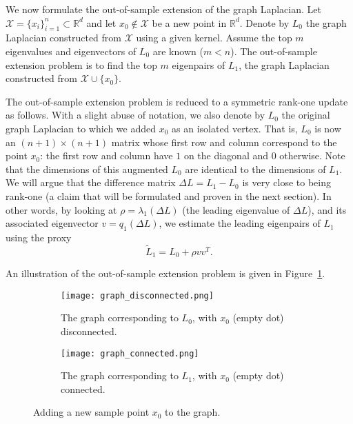 \documentclass[11pt]{article}
\begin{document}
\noindent
We now formulate the out-of-sample extension of the graph Laplacian. Let $\mathcal{X} = \{ x_i \}_{i=1}^n \subset \mathbb{R}^d $ and let $x_0 \not\in \mathcal{X}$ be a new point in $\mathbb{R}^d $. Denote by $L_0$ the graph Laplacian constructed from $\mathcal{X}$ using a given kernel. Assume the top $m$ eigenvalues and eigenvectors of $L_0$ are known ($m<n$). The out-of-sample extension problem is to find the top $m$ eigenpairs of $L_1$, the graph Laplacian constructed from $\mathcal{X} \cup \{x_0\}$.

The out-of-sample extension problem is reduced to a symmetric rank-one update as follows. With a slight abuse of notation, we also denote by $L_0$ the original graph Laplacian to which we added $x_0$ as an isolated vertex. That is, $L_0$ is now an $(n+1) \times (n+1)$ matrix whose first row and column correspond to the point $x_0$: the first row and column have $1$ on the diagonal and $0$ otherwise. Note that the dimensions of this augmented $L_0$ are identical to the dimensions of $L_1$. We will argue that the difference matrix $\Delta L = L_1 - L_0$ is very close to being rank-one (a claim that will be formulated and proven in the next section). In other words, by looking at  $\rho = \lambda_1(\Delta L)$ (the leading eigenvalue of $\Delta L$), and its associated eigenvector $v = q_1(\Delta L)$, we estimate the leading eigenpairs of $L_1$ using the proxy
\begin{equation} \label{eq:proxy}
\widetilde{L}_1 = L_0 + \rho vv^T .
\end{equation}

An illustration of the out-of-sample extension problem is given in Figure~\ref{fig:newnode}.
\begin{figure} 
    \centering
    \begin{subfigure}[b]{0.4\textwidth}
        \texttt{[image: graph\_disconnected.png]}
        \caption{The graph corresponding to $L_0$, with $x_0$ (empty dot) disconnected.}
    \end{subfigure}
    \begin{subfigure}[b]{0.4\textwidth}
        \texttt{[image: graph\_connected.png]}
        \caption{The graph corresponding to $L_1$, with $x_0$ (empty dot) connected.}      
    \end{subfigure}  
    \caption{Adding a new sample point $x_0$ to the graph. }\label{fig:newnode}
\end{figure}

\end{document}
